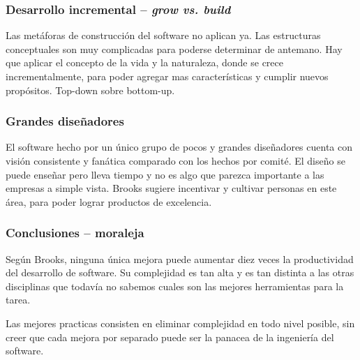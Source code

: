 \documentclass{beamer}
\begin{document}
\begin{frame}[fragile]
  \frametitle{Desarrollo incremental -- \textit{grow vs. build}}
  Las met\'aforas de construcci\'on del software no aplican ya. Las estructuras conceptuales son muy
  complicadas para poderse determinar de antemano. Hay que aplicar el concepto de la vida y la naturaleza,
  donde se crece incrementalmente, para poder agregar mas caracter\'isticas y cumplir nuevos prop\'ositos.
  Top-down sobre bottom-up.
\end{frame}

\begin{frame}[fragile]
  \frametitle{Grandes dise\~nadores}
  El software hecho por un \'unico grupo de pocos y grandes dise\~nadores cuenta con visi\'on consistente
  y fan\'atica comparado con los hechos por comit\'e. El dise\~no se puede ense\~nar pero lleva tiempo
  y no es algo que parezca importante a las empresas a simple vista. Brooks sugiere incentivar y
  cultivar personas en este \'area, para poder lograr productos de excelencia.
\end{frame}

\begin{frame}[fragile]
  \frametitle{Conclusiones -- moraleja}
  Seg\'un Brooks, ninguna \'unica mejora puede aumentar diez veces la productividad del desarrollo de software.
  Su complejidad es tan alta y es tan distinta a las otras disciplinas que todav\'ia no sabemos cuales
  son las mejores herramientas para la tarea.

  Las mejores practicas consisten en eliminar complejidad en todo nivel posible, sin creer que cada
  mejora por separado puede ser la panacea de la ingenier\'ia del software.
\end{frame}
\end{document}
